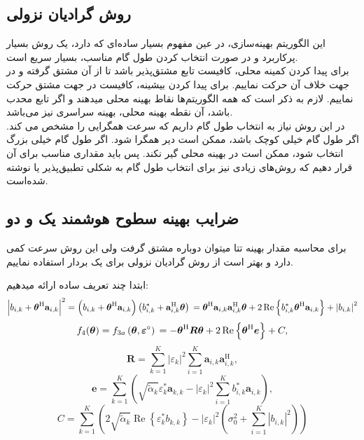 \subsection{روش گرادیان نزولی}
\cite{15}
این الگوریتم بهینه‌سازی، در عین مفهوم بسیار ساده‌ای که دارد، یک روش بسیار پرکاربرد و در صورت انتخاب کردن طول گام مناسب، بسیار سریع است.\\
برای پیدا کردن کمینه محلی، کافیست تابع مشتق‌پذیر باشد تا از آن مشتق گرفته و در جهت خلاف آن حرکت نماییم. 
برای پیدا کردن بیشینه، کافیست در جهت مشتق حرکت نماییم.
لازم به ذکر است که همه الگوریتم‌ها نقاط بهینه‌ محلی میدهند و اگر تابع محدب باشد، آن نقطه بهینه محلی، بهینه سراسری نیز می‌باشد.\\
در این روش نیاز به انتخاب طول گام داریم که سرعت همگرایی را مشخص می کند. اگر طول گام خیلی کوچک باشد، ممکن است دیر همگرا شود. اگر طول گام خیلی بزرگ انتخاب شود، ممکن است در بهینه محلی گیر نکند. پس باید مقداری مناسب برای آن قرار دهیم که روش‌های زیادی نیز برای انتخاب طول گام به شکلی تطبیق‌پذیر یا  نوشته شده‌است.

\newpage
\subsection{ضرایب بهینه سطوح هوشمند یک و دو}
برای محاسبه مقدار بهینه تتا میتوان دوباره مشتق گرفت ولی این روش سرعت کمی دارد و بهتر است از روش گرادیان نزولی برای یک بردار استفاده نماییم.

ابتدا چند تعریف ساده ارائه میدهیم:
\[
	\left|b_{i, k}+\boldsymbol{\theta}^{\mathrm{H}} \mathbf{a}_{i, k}\right|^{2}  =\left(b_{i, k}+\boldsymbol{\theta}^{\mathrm{H}} \mathbf{a}_{i, k}\right)\left(b_{i, k}^{*}+\mathbf{a}_{i, k}^{\mathrm{H}} \boldsymbol{\theta}\right) \\
	 =\boldsymbol{\theta}^{\mathrm{H}} \mathbf{a}_{i, k} \mathbf{a}_{i, k}^{\mathrm{H}} \boldsymbol{\theta}+2 \operatorname{Re}\left\{b_{i, k}^{*} \boldsymbol{\theta}^{\mathrm{H}} \mathbf{a}_{i, k}\right\}+\left|b_{i, k}\right|^{2}
\]
\[	f_{4}(\boldsymbol{\theta})  =f_{3 a}\left(\boldsymbol{\theta}, \boldsymbol{\varepsilon}^{\circ}\right) \\
	 =-\boldsymbol{\theta}^{\mathrm{H}} \boldsymbol{R} \boldsymbol{\theta}+2 \operatorname{Re}\left\{\boldsymbol{\theta}^{\mathrm{H}} \boldsymbol{e}\right\}+C,
\]
\[	\boldsymbol{R}  =\sum_{k=1}^{K}\left|\varepsilon_{k}\right|^{2} \sum_{i=1}^{K} \mathbf{a}_{i, k} \mathbf{a}_{i, k}^{\mathrm{H}},
\]
\[
	\boldsymbol{e}  =\sum_{k=1}^{K}\left(\sqrt{\tilde{\alpha}_{k}} \varepsilon_{k}^{*} \mathbf{a}_{k, k}-\left|\varepsilon_{k}\right|^{2} \sum_{i=1}^{K} b_{i, k}^{*} \mathbf{a}_{i, k}\right),
\]
\[
	C  =\sum_{k=1}^{K}\left(2 \sqrt{\tilde{\alpha}_{k}} \operatorname{Re}\left\{\varepsilon_{k}^{*} b_{k, k}\right\}-\left|\varepsilon_{k}\right|^{2}\left(\sigma_{0}^{2}+\sum_{i=1}^{K}\left|b_{i, k}\right|^{2}\right)\right)
\]

